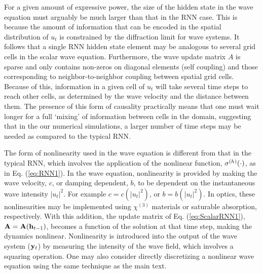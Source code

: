 For a given amount of expressive power, the size of the hidden state in the wave equation must arguably be much larger than that in the RNN case.  This is because the amount of information that can be encoded in the spatial distribution of $u_t$ is constrained by the diffraction limit for wave systems.  It follows that a single RNN hidden state element may be analogous to several grid cells in the scalar wave equation. Furthermore, the wave update matrix $A$ is sparse and only contains non-zeros on diagonal elements (self coupling) and those corresponding to neighbor-to-neighbor coupling between spatial grid cells.  Because of this, information in a given cell of $u_t$ will take several time steps to reach other cells, as determined by the wave velocity and the distance between them.  The presence of this form of causality practically means that one must wait longer for a full `mixing' of information between cells in the domain, suggesting that in the our numerical simulations, a larger number of time steps may be needed as compared to the typical RNN. 


The form of nonlinearity used in the wave equation is different from that in the typical RNN, which involves the application of the nonlinear function, $\sigma^{(h)}(\cdot)$, as in Eq. (\ref{eq:RNN1}).  In the wave equation, nonlinearity is provided by making the wave velocity, $c$, or damping dependent, $b$, to be dependent on the instantaneous wave intensity $|u_t|^2$.  For example $c = c(|u_t|^2)$, or $b = b(|u_t|^2)$.  In optics, these nonlinearities may be implemented using $\chi^{(3)}$ materials or saturable absorption, respectively.  With this addition, the update matrix of Eq. (\ref{eq:ScalarRNN1}), $\mathbf{A} = \mathbf{A}(\mathbf{h}_{t-1})$, becomes a function of the solution at that time step, making the dynamics nonlinear.  Nonlinearity is introduced into the  output of the wave system ($\mathbf{y}_t$) by measuring the intensity of the wave field, which involves a squaring operation.  One may also consider directly discretizing a nonlinear wave equation using the same technique as the main text.

